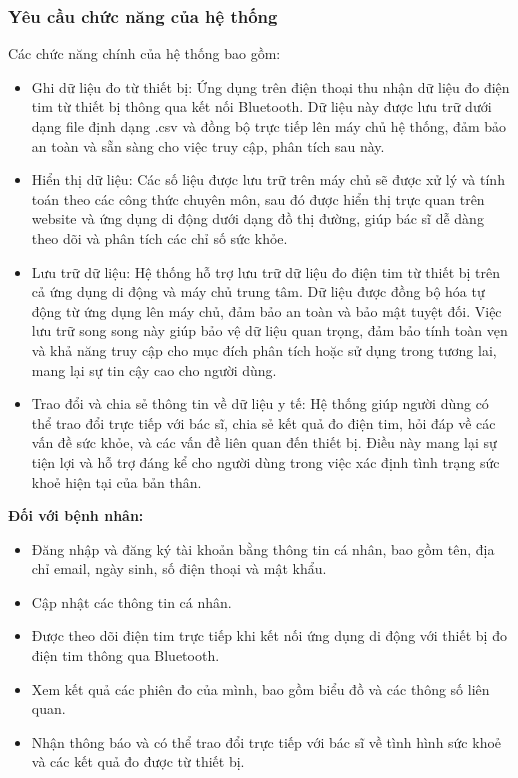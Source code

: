 \subsubsection{Yêu cầu chức năng của hệ thống}
Các chức năng chính của hệ thống bao gồm:
\begin{adjustwidth}{1.5em}{}
  \begin{itemize}
      \item Ghi dữ liệu đo từ thiết bị: Ứng dụng trên điện thoại thu nhận dữ liệu đo điện tim từ thiết bị thông qua kết nối Bluetooth.
      Dữ liệu này được lưu trữ dưới dạng file định dạng .csv và đồng bộ trực tiếp lên máy chủ hệ thống, đảm bảo an toàn và sẵn sàng cho việc truy cập, phân tích sau này.
      \item Hiển thị dữ liệu: Các số liệu được lưu trữ trên máy chủ sẽ được xử lý và tính toán theo các công thức chuyên môn, sau đó được hiển thị trực quan trên website và ứng dụng di động dưới dạng đồ thị đường, giúp bác sĩ dễ dàng theo dõi và phân tích các chỉ số sức khỏe.
      \item Lưu trữ dữ liệu: Hệ thống hỗ trợ lưu trữ dữ liệu đo điện tim từ thiết bị trên cả ứng dụng di động và máy chủ trung tâm. Dữ liệu được đồng bộ hóa tự động từ ứng dụng lên máy chủ, đảm bảo an toàn và bảo mật tuyệt đối. Việc lưu trữ song song này giúp bảo vệ dữ liệu quan trọng, đảm bảo tính toàn vẹn và khả năng truy cập cho mục đích phân tích hoặc sử dụng trong tương lai, mang lại sự tin cậy cao cho người dùng.
      \item Trao đổi và chia sẻ thông tin về dữ liệu y tế: Hệ thống giúp người dùng có thể trao đổi trực tiếp với bác sĩ, chia sẻ kết quả đo điện tim, hỏi đáp về các vấn đề sức khỏe, và các vấn đề liên quan đến thiết bị. Điều này mang lại sự tiện lợi và hỗ trợ đáng kể cho người dùng trong việc xác định tình trạng sức khoẻ hiện tại của bản thân.
      

  \end{itemize}
\end{adjustwidth}
\textbf{Đối với bệnh nhân:}
\begin{adjustwidth}{1.5em}{}
\begin{itemize}
    \item Đăng nhập và đăng ký tài khoản bằng thông tin cá nhân, bao gồm tên, địa chỉ email, ngày sinh, số điện thoại và mật khẩu.
    \item Cập nhật các thông tin cá nhân.
    \item Được theo dõi điện tim trực tiếp khi kết nối ứng dụng di động với thiết bị đo điện tim thông qua Bluetooth.
    \item Xem kết quả các phiên đo của mình, bao gồm biểu đồ và các thông số liên quan.
    \item Nhận thông báo và có thể trao đổi trực tiếp với bác sĩ về tình hình sức khoẻ và các kết quả đo được từ thiết bị.
\end{itemize}
\end{adjustwidth}

